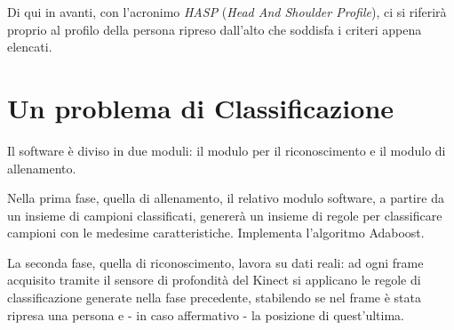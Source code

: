 Di qui in avanti, con l'acronimo \emph{HASP} (\emph{Head And Shoulder Profile}), ci si riferirà proprio al profilo della persona ripreso dall'alto che soddisfa i criteri appena elencati.

\section{Un problema di Classificazione} %
\label{sub:struttura_software}
Il software è diviso in due moduli: il modulo per il riconoscimento e il modulo di allenamento.

Nella prima fase, quella di allenamento, il relativo modulo software, a partire da un insieme di campioni classificati, genererà un insieme di regole per classificare campioni con le medesime caratteristiche. Implementa l'algoritmo Adaboost.

La seconda fase, quella di riconoscimento, lavora su dati reali: ad ogni frame acquisito tramite il sensore di profondità del Kinect si applicano le regole di classificazione generate nella fase precedente, stabilendo se nel frame è stata ripresa una persona e - in caso affermativo - la posizione di quest'ultima.
